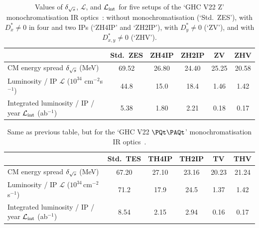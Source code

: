 \begin{table}[ht]
\caption{Values of $\delta_{\sqrt{s}}$, $\mathcal{L}$, and $\mathcal{L}_\text{int}$ for five setups of the `GHC V22 Z' monochromatisation IR optics~\cite{Zhang:2024sao}:
without monochromatisation (`Std.\ ZES'), 
with $D^*_x \ne 0$ in four and two IPs (`ZH4IP' and `ZH2IP'),
with $D^*_y \ne 0$ (`ZV'), 
and with $D^*_{x,y} \ne 0$ (`ZHV').}
\label{tab:monochromZ}
\centering
\begin{tabular}{lccccc}\hline
    & Std.\ ZES & ZH4IP & ZH2IP & ZV & ZHV \\\hline
    CM energy spread $\delta_{\sqrt{s}}$ (MeV) & 69.52 & 26.80 & 24.40 & 25.25 & 20.58 \\
    Luminosity / IP $\mathcal{L}$ ($10^{34}$ cm$^{-2}$s$^{-1}$) & 44.8 & 15.0 & 18.4 & 1.46 & 1.42 \\
    Integrated luminosity / IP / year $\mathcal{L}_\text{int}$ (ab$^{-1}$) & 5.38 & 1.80 & 2.21 & 0.18 & 0.17 \\\hline
\end{tabular}
\end{table}

\begin{table}[ht]
\caption{Same as previous table, but for the `GHC V22 $\PQt\PAQt$' monochromatisation IR optics~\cite{Zhang:2024sao}.}
\label{tab:monochromtt}
\centering
\begin{tabular}{lccccc}\hline
    & Std.\ TES & TH4IP & TH2IP & TV & THV \\\hline
    CM energy spread $\delta_{\sqrt{s}}$ (MeV) & 67.20 & 27.10 & 23.16 & 20.23 & 21.24 \\
    Luminosity / IP $\mathcal{L}$ ($10^{34}$\,cm$^{-2}$s$^{-1}$) & 71.2 & 17.9 & 24.5 & 1.37 & 1.42 \\
    Integrated luminosity / IP / year $\mathcal{L}_\text{int}$ (ab$^{-1}$) & 8.54 & 2.15 & 2.94 & 0.16 & 0.17 \\
    \hline
\end{tabular}
\end{table}

